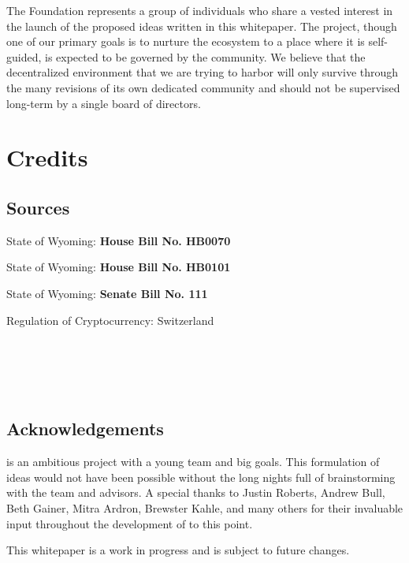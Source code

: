 \documentclass{kwp-builder}
\begin{document}
\tab The \konjure Foundation represents a group of individuals who share a vested interest in the launch of the proposed ideas written in this whitepaper. The \konjure project, though one of our primary goals is to nurture the ecosystem to a place where it is self-guided, is expected to be governed by the community. We believe that the decentralized environment that we are trying to harbor will only survive through the many revisions of its own dedicated community and should not be supervised long-term by a single board of directors.


\section{Credits}
\subsection{Sources}

\begin{thebibliography}{9}
State of Wyoming: \textbf{House Bill No. HB0070}
\\\texttt{}

State of Wyoming: \textbf{House Bill No. HB0101}
\\\texttt{}

State of Wyoming: \textbf{Senate Bill No. 111}
\\\texttt{}
 
Regulation of Cryptocurrency: Switzerland
\\\texttt{}

\cardano
\\\texttt{}

\ipfs
\\\texttt{ }
\end{thebibliography}

\subsection{Acknowledgements}

\tab \konjure is an ambitious project with a young team and big goals. This formulation of ideas would not have been possible without the long nights full of brainstorming with the \konjure team and advisors. A special thanks to Justin Roberts, Andrew Bull, Beth Gainer, Mitra Ardron, Brewster Kahle, and many others for their invaluable input throughout the development of \konjure to this point.\bigskip

This whitepaper is a work in progress and is subject to future changes.
\end{document}
